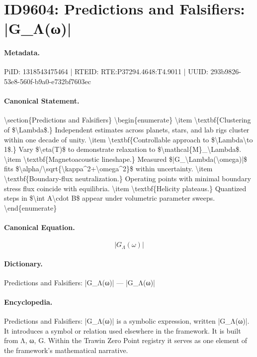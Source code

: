 \section*{ID9604: Predictions and Falsifiers: |G\_Λ(ω)|}
\paragraph{Metadata.}
PiID: 1318543475464 | RTEID: RTE:P37294.4648:T4.9011 | UUID: 293b9826-53e8-560f-b9a0-e732bf7603ec

\paragraph{Canonical Statement.}
\textbackslash{}section\{Predictions and Falsifiers\} \textbackslash{}begin\{enumerate\} \textbackslash{}item \textbackslash{}textbf\{Clustering of \$\textbackslash{}Lambda\$.\} Independent estimates across planets, stars, and lab rigs cluster within one decade of unity. \textbackslash{}item \textbackslash{}textbf\{Controllable approach to \$\textbackslash{}Lambda\textbackslash{}to 1\$.\} Vary \$\textbackslash{}eta(T)\$ to demonstrate relaxation to \$\textbackslash{}mathcal\{M\}\_\textbackslash{}Lambda\$. \textbackslash{}item \textbackslash{}textbf\{Magnetoacoustic lineshape.\} Measured \$|G\_\textbackslash{}Lambda(\textbackslash{}omega)|\$ fits \$\textbackslash{}alpha/\textbackslash{}sqrt\{\textbackslash{}kappa\textasciicircum{}2+\textbackslash{}omega\textasciicircum{}2\}\$ within uncertainty. \textbackslash{}item \textbackslash{}textbf\{Boundary-flux neutralization.\} Operating points with minimal boundary stress flux coincide with equilibria. \textbackslash{}item \textbackslash{}textbf\{Helicity plateaus.\} Quantized steps in \$\textbackslash{}int A\textbackslash{}cdot B\$ appear under volumetric parameter sweeps. \textbackslash{}end\{enumerate\}

\paragraph{Canonical Equation.}
\[
|G_\Lambda(\omega)|
\]

\paragraph{Dictionary.}
Predictions and Falsifiers: |G\_Λ(ω)| — |G\_Λ(ω)|

\paragraph{Encyclopedia.}
Predictions and Falsifiers: |G\_Λ(ω)| is a symbolic expression, written |G\_Λ(ω)|. It introduces a symbol or relation used elsewhere in the framework. It is built from Λ, ω, G. Within the Trawin Zero Point registry it serves as one element of the framework's mathematical narrative.
